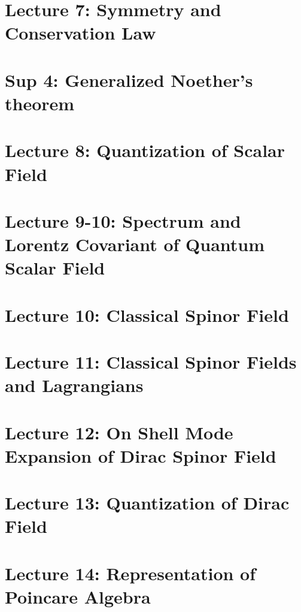 \documentclass[10pt]{article}
\begin{document}
\newpage
\section{Lecture 7: Symmetry and Conservation Law}\label{sec:Lecture 7} %


\newpage 
\section{Sup 4: Generalized Noether's theorem}\label{sec:Sup 4: Generalized Noether's theorem} %


\newpage
\section{Lecture 8: Quantization of Scalar Field}\label{sec:Lecture 8: 标量场量子化} %


\newpage 
\section{Lecture 9-10: Spectrum and Lorentz Covariant of Quantum Scalar Field}\label{sec:Lecture 9: Spectrum and Peoperties of Quantum Scalar Field} %
 

\newpage
\section{Lecture 10: Classical Spinor Field}\label{sec:Lecture 10} %


\newpage
\section{Lecture 11: Classical Spinor Fields and Lagrangians}\label{sec:Lecture 11: } %


\newpage 
\section{Lecture 12: On Shell Mode Expansion of Dirac Spinor Field}\label{sec:Lecture 12:} %


\newpage 
\section{Lecture 13: Quantization of Dirac Field}\label{sec:Lecture 13:} %


\newpage
\section{Lecture 14: Representation of Poincare Algebra}\label{sec:Lecture 14:} %

\end{document}
